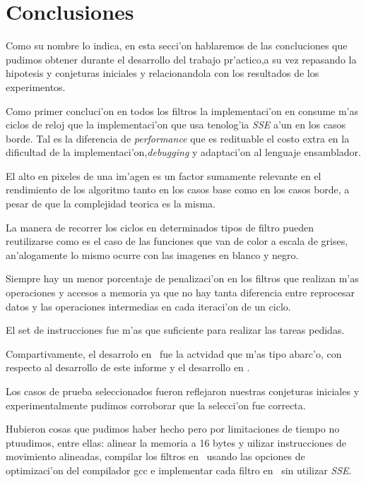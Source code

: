 \section{Conclusiones}
\label{sec:conclusiones}
Como su nombre lo indica, en esta secci'on hablaremos de las concluciones que pudimos obtener durante el desarrollo del 
trabajo pr'actico,a su vez repasando la hipotesis y conjeturas iniciales y relacionandola con los resultados de los experimentos.

Como primer concluci'on en todos los filtros la implementaci'on en \C consume m'as ciclos de reloj que la implementaci'on que usa
tenolog'ia \textit{SSE} a'un en los casos borde. Tal es la diferencia de \textit{performance} que es redituable el costo extra en 
la dificultad de la implementaci'on,\textit{debugging} y adaptaci'on al lenguaje ensamblador.

El alto en pixeles de una im'agen es un factor sumamente relevante en el rendimiento de los algoritmo tanto en los casos base
como en los casos borde, a pesar de que la complejidad teorica es la misma.

La manera de recorrer los ciclos en determinados tipos de filtro pueden reutilizarse como es el caso de las funciones que van de color 
a escala de grises, an'alogamente lo mismo ocurre con las imagenes en blanco y negro.

Siempre hay un menor porcentaje de penalizaci'on en los filtros que realizan m'as operaciones y accesos a memoria ya que 
no hay tanta diferencia entre reprocesar datos y las operaciones intermedias en cada iteraci'on de un ciclo.

El set de instrucciones fue m'as que suficiente para realizar las tareas pedidas.

Compartivamente, el desarrolo en \ass \ fue la actvidad que m'as tipo abarc'o, con respecto al desarrollo de este informe y
el desarrollo en \C.

Los casos de prueba seleccionados fueron reflejaron nuestras conjeturas iniciales y experimentalmente pudimos corroborar 
que la selecci'on fue correcta.

Hubieron cosas que pudimos haber hecho pero por limitaciones de tiempo no ptuudimos, entre ellas: alinear la memoria a 16 bytes
y uilizar instrucciones de movimiento alineadas, compilar los filtros en \C \ usando las opciones de optimizaci'on del compilador
gcc e implementar cada filtro en \ass \ sin utilizar \textit{SSE}.  

